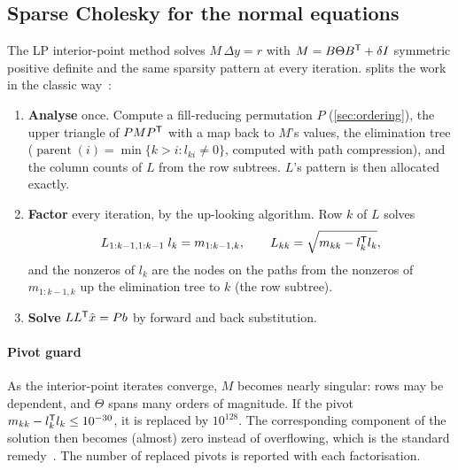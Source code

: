 \subsection{Sparse Cholesky for the normal equations}\label{sec:chol}
The LP interior-point method solves $M\,\Delta y=r$ with $M=B\Theta B^{\mathsf{T}}+\delta I$ symmetric
positive definite and the same sparsity pattern at every iteration. 
splits the work in the classic way~\cite{davis2006}:
\begin{enumerate}
  \item \textbf{Analyse} once. Compute a fill-reducing permutation $P$ (\cref{sec:ordering}), the
        upper triangle of $PMP^{\mathsf{T}}$ with a map back to $M$'s values, the elimination tree
        ($\operatorname{parent}(i)=\min\{k>i: l_{ki}\ne0\}$, computed with path compression), and
        the column counts of $L$ from the row subtrees. $L$'s pattern is then allocated exactly.
  \item \textbf{Factor} every iteration, by the up-looking algorithm. Row $k$ of $L$ solves
        \begin{equation}\label{eq:uplook}
          L_{1:k-1,1:k-1}\; l_{k} = m_{1:k-1,k},\qquad
          L_{kk} = \sqrt{m_{kk} - l_k^{\mathsf{T}} l_k},
        \end{equation}
        and the nonzeros of $l_k$ are the nodes on the paths from the nonzeros of $m_{1:k-1,k}$
        up the elimination tree to $k$ (the row subtree).
  \item \textbf{Solve} $LL^{\mathsf{T}}\hat x = P b$ by forward and back substitution.
\end{enumerate}

\paragraph{Pivot guard}
As the interior-point iterates converge, $M$ becomes nearly singular: rows may be dependent,
and $\Theta$ spans many orders of magnitude. If the pivot $m_{kk}-l_k^{\mathsf{T}} l_k\le 10^{-30}$, it is
replaced by $10^{128}$. The corresponding component of the solution then becomes (almost) zero
instead of overflowing, which is the standard remedy~\cite[§11.1]{wright1997}. The number of
replaced pivots is reported with each factorisation.

